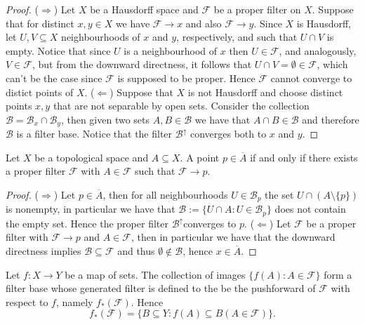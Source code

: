 \begin{proof}
  (\(\Rightarrow\)) Let \(X\) be a Hausdorff space and \(\mathcal F\) be a
  proper filter on \(X\). Suppose that for distinct \(x, y \in X\) we have
  \(\mathcal F \to x\) and also \(\mathcal F \to y\). Since \(X\) is Hausdorff,
  let \(U, V \subseteq X\) neighbourhoods of \(x\) and \(y\), respectively, and
  such that \(U \cap V\) is empty. Notice that since \(U\) is a neighbourhood of
  \(x\) then \(U \in \mathcal F\), and analogously, \(V \in \mathcal F\), but
  from the downward directness, it follows that \(U \cap V = \emptyset \in
  \mathcal F\), which can't be the case since \(\mathcal F\) is supposed to be
  proper. Hence \(\mathcal F\) cannot converge to distict points of \(X\).
  (\(\Leftarrow\)) Suppose that \(X\) is not Hausdorff and choose distinct
  points \(x, y\) that are not separable by open sets. Consider the collection
  \(\mathcal B = \mathcal B_x \cap \mathcal B_y\), then given two sets \(A, B
  \in \mathcal B\) we have that \(A \cap B \in \mathcal B\) and therefore
  \(\mathcal B\) is a filter base. Notice that the filter \(\mathcal B^\uparrow\)
  converges both to \(x\) and \(y\).
\end{proof}

\begin{proposition}[Closed]\label{prop: closed from filter}
  Let \(X\) be a topological space and \(A \subseteq X\). A point \(p \in
  \overline A\) if and only if there exists a proper filter \(\mathcal F\) with
  \(A \in \mathcal F\) such that \(\mathcal F \to p\).
\end{proposition}

\begin{proof}
  (\(\Rightarrow\)) Let \(p \in \overline A\), then for all neighbourhoods \(U
  \in \mathcal B_p\) the set \(U \cap (A \setminus \{p\})\) is nonempty, in
  particular we have that \(\mathcal B := \{U \cap A : U \in \mathcal B_p\}\)
  does not contain the empty set. Hence the proper filter \(\mathcal
  B^\uparrow\)converges to \(p\). (\(\Leftarrow\)) Let \(\mathcal F\) be a
  proper filter with \(\mathcal F \to p\) and \(A \in \mathcal F\), then in
  particular we have that the downward directness implies \(\mathcal B \subseteq
  \mathcal F\) and thus \(\emptyset \not\in \mathcal B\), hence \(x \in
  \overline A\).
\end{proof}

\begin{definition}\label{def: pushforward of filters}
  Let \(f: X \to Y\) be a map of sets. The collection of images \(\{f(A) : A \in
  \mathcal F\}\) form a filter base whose generated filter is defined to the be
  the pushforward of \(\mathcal F\) with respect to \(f\), namely
  \(f_\ast(\mathcal F)\). Hence
  \[
    f_\ast(\mathcal F) = \{B \subseteq Y : f(A) \subseteq B (A \in \mathcal
    F)\}.
  \]
\end{definition}


